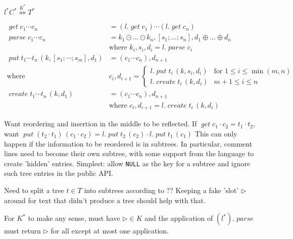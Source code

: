 \documentclass[12pt,fleqn]{amsart}
\newcommand{\ensmath}[1]{\ensuremath{#1}\xspace}
\newcommand{\opnam}[1]{\ensmath{\operatorname{\mathit{#1}}}}
\newcommand{\nparse}{\opnam{parse}}
\newcommand{\lget}[1]{\opnam{get}{#1}}
\newcommand{\lparse}[1]{\nparse{#1}}
\newcommand{\lput}[2]{\opnam{put}{#1}\,{(#2)}}
\newcommand{\lcreate}[2]{\opnam{create}{#1}\,{(#2)}}
\newcommand{\lenstype}[3][K]{\ensmath{{#2}\stackrel{#1}{\Longleftrightarrow}{#3}}}
\newcommand{\conc}[2]{\ensmath{#1\cdot #2}}
\newcommand{\cstar}[1]{\ensmath{#1^*}}
\newcommand{\uastar}[1]{\ensmath{#1^{!*}}}
\newcommand{\key}[1]{\ensmath{\kappa(#1)}}
\begin{document}
\infrule{l\in\lenstype{C}{T} \andalso \uastar{C} \andalso \uastar{\key{T}}}
        {\cstar{l}\in\lenstype[\cstar{K}]{\cstar{C}}{\cstar{T}}}

\begin{align*}
  \lget{c_1\cdots c_n} &= (l.\lget{c_1}) \cdots (l.\lget{c_n})\\
  \lparse{c_1\cdots c_n} &= k_1\odot\ldots\odot k_n, [s_1;\ldots;s_n],
                            d_1\oplus\ldots\oplus d_n\\
                            & \text{where } k_i,s_i,d_i = l.\lparse{c_i}\\
  \lput{t_1\cdots t_n}{k, [s_1;\cdots;s_m], d_1} &= (c_1 \cdots c_n), d_{n+1}\\
  \text{where } &c_i, d_{i+1} =
    \begin{cases}
      l.\lput{t_i}{k, s_i, d_i} & \text{for } 1 \leq i \leq \min(m,n)\\
      l.\lcreate{t_i}{k, d_i} & m+1 \leq i \leq n
    \end{cases}\\
  \lcreate{t_1 \cdots t_n}{k, d_1} &= (c_1\cdots c_n), d_{n+1}\\
  & \text{where } c_i, d_{i+1} = l.\lcreate{t_i}{k, d_i}
\end{align*}

Want reordering and insertion in the middle to be reflected. If
$\lget{\conc{c_1}{c_2}} = \conc{t_1}{t_2}$, want
$\lput{(\conc{t_2}{t_1})}{\conc{c_1}{c_2}} =
\conc{l.\lput{t_2}{c_2}}{l.\lput{t_1}{c_1}}$ This can only happen if the
information to be reordered is in subtrees. In particular, comment lines
need to become their own subtree, with some support from the language to
create 'hidden' entries. Simplest: allow {\tt NULL} as the key for a
subtree and ignore such tree entries in the public API.

Need to split a tree $t\in T$ into subtrees according to ?? Keeping a fake
'slot' $\rhd$ around for text that didn't produce a tree should help with
that.

For $K^*$ to make any sense, must have $\rhd\in K$ and the application of
$(l^*).\nparse$ must return $\rhd$ for all except at most one application.
\end{document}
